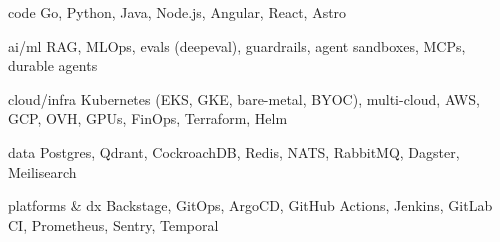 
\begin{cvskills}

  \cvskill
    {code}
    {Go, Python, Java, Node.js, Angular, React, Astro}

  \cvskill
    {ai/ml}
    {RAG, MLOps, evals (deepeval), guardrails, agent sandboxes, MCPs, durable agents}

  \cvskill
    {cloud/infra}
    {Kubernetes (EKS, GKE, bare-metal, BYOC), multi-cloud, AWS, GCP, OVH, GPUs, FinOps, Terraform, Helm}

  \cvskill
    {data}
    {Postgres, Qdrant, CockroachDB, Redis, NATS, RabbitMQ, Dagster, Meilisearch}

  \cvskill
    {platforms \& dx}
    {Backstage, GitOps, ArgoCD, GitHub Actions, Jenkins, GitLab CI, Prometheus, Sentry, Temporal}

\end{cvskills}
